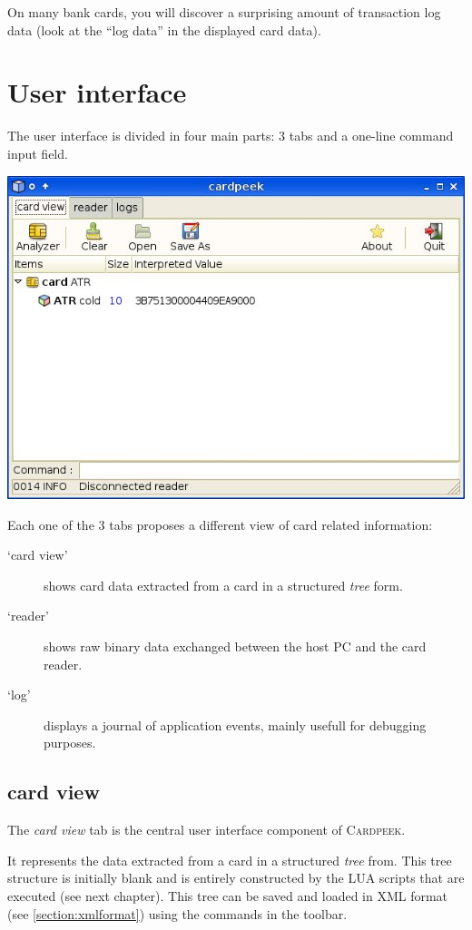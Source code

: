 \documentclass[11pt]{report}
\newcommand{\Cardpeek}{\textsc{Cardpeek}}
\begin{document}
On many bank cards, you will discover a surprising amount of transaction log data (look at the ``log data'' 
in the displayed card data).

\section{User interface}

The user interface is divided in four main parts: 3 tabs and a one-line command input field.

\begin{center}
\includegraphics[width=.75\textwidth]{graphics/sample-blank.jpg}
\end{center}

Each one of the 3 tabs proposes a different view of card related information:
\begin{description}
\item[`card view']{shows card data extracted from a card in a structured \emph{tree} form.}  
\item[`reader']{shows raw binary data exchanged between the host PC and the card reader.}
\item[`log']{displays a journal of application events, mainly usefull for debugging purposes.}  
\end{description}

\subsection{card view}

The \emph{card view} tab is the central user interface component of \Cardpeek. 

It represents the data extracted from a card in a structured \emph{tree} from.
This tree structure is initially blank and is entirely constructed by the LUA scripts that are executed (see next chapter).
This tree can be saved and loaded in XML format (see \ref{section:xmlformat}) using the commands in the toolbar.
\end{document}
